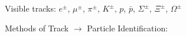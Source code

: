 
\begin{slide*}
\slideframe{}
\begin{minipage}[t]{\linewidth}
\huge

\vspace{0.1 cm}

Visible tracks: $e^\pm$, $\mu^\pm$, $\pi^\pm$, $K^\pm$, $p$, $\bar{p}${\gray, $\Sigma^\pm$, $\Xi^\pm$, $\Omega^\pm$} \\

\vspace{-0.5 cm}

Methods of Track $\to$ Particle Identification: \\
\vspace{-0.5 cm}


\end{minipage}
\end{slide*}
